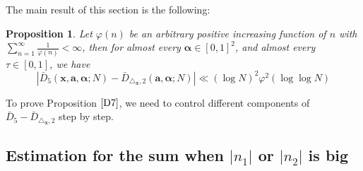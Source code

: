 \documentclass[11pt]{article}
\newtheorem{Prop}{Proposition}[section]
\newcommand{\fc}{\frac}
\renewcommand{\a}{\alpha}
\renewcommand{\(}{\left(}
\renewcommand{\)}{\right)}
\renewcommand{\bf}{\mathbf}
\newcommand{\bma}{\bm{\alpha}}
\newcommand{\Dbartwo}{\bar{D}_{\triangle_{\bf{x}},2} (\bm{a},\bm{\a};N)}
\newcommand{\<}{\langle}
\renewcommand{\>}{\rangle}
\begin{document}
The main result of this section is the following:

\begin{Prop}\label{D7}
Let $\varphi(n)$ be an arbitrary positive increasing function of $n$ with $\sum_{n=1}^{\infty}\fc{1}{\varphi(n)}< \infty$, then for almost every $\bma\in[0,1]^2$, and almost every $\tau \in [0,1]$, we have 
$$|\bar{D}_5(\bf{x},\bm{a},\bm{\a};N)-\Dbartwo|\ll (\log N)^2\varphi^2(\log \log N)$$
\end{Prop}

To prove Proposition $\ref{D7}$, we need to control different components of $\bar{D}_5-\bar{D}_{\triangle_{\bf{x}},2}$ step by step.

\subsection{Estimation for the sum when $|n_1|$ or $|n_2|$ is big}
\end{document}
